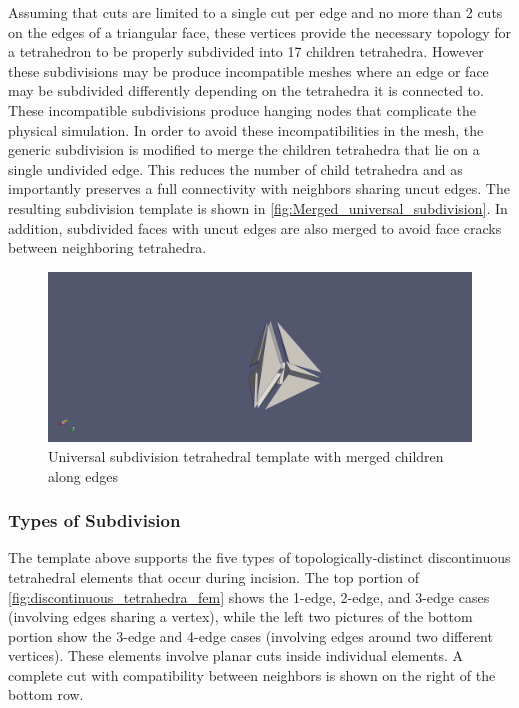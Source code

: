Assuming that cuts are limited to a single cut per edge and no more than 2 cuts on the edges of a triangular face, these vertices provide the necessary topology for a tetrahedron to be properly subdivided into 17 children tetrahedra. However these subdivisions may be produce incompatible meshes where an edge or face may be subdivided differently depending on the tetrahedra it is connected to. These incompatible subdivisions produce hanging nodes that complicate the physical simulation. In order to avoid these incompatibilities in the mesh, the generic subdivision is modified to merge the children tetrahedra that lie on a single undivided edge. This reduces the number of child tetrahedra and as importantly preserves a full connectivity with neighbors sharing uncut edges. The resulting subdivision template is shown in \autoref{fig:Merged_universal_subdivision}. In addition, subdivided faces with uncut edges are also merged to avoid face cracks between neighboring tetrahedra.

\begin{figure}
  \centering%
  \includegraphics[width=0.85\linewidth,frame]{figures/cutting/Merged_universal.png}
  \caption{Universal subdivision tetrahedral template with merged children along edges}
  \label{fig:Merged_universal_subdivision}
\end{figure}


\subsubsection{Types of Subdivision}

The template above supports the five types of topologically-distinct discontinuous tetrahedral elements that occur during incision. The top portion of \autoref{fig:discontinuous_tetrahedra_fem} shows the 1-edge, 2-edge, and 3-edge cases (involving edges sharing a vertex), while the left two pictures of the bottom portion show the 3-edge and 4-edge cases (involving edges around two different vertices). These elements involve planar cuts inside individual elements. A complete cut with compatibility between neighbors is shown on the right of the bottom row.

